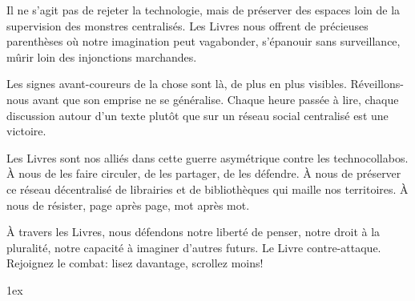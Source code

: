 \documentclass[a5paper, 10pt, twoside]{book}
\begin{document}
Il ne s’agit pas de rejeter la technologie, mais de préserver des
espaces loin de la supervision des monstres centralisés. Les Livres nous
offrent de précieuses parenthèses où notre imagination peut vagabonder,
s’épanouir sans surveillance, mûrir loin des injonctions marchandes.

Les signes avant-coureurs de la chose sont là, de plus en plus visibles.
Réveillons-nous avant que son emprise ne se généralise. Chaque heure
passée à lire, chaque discussion autour d’un texte plutôt que sur un
réseau social centralisé est une victoire.

Les Livres sont nos alliés dans cette guerre asymétrique contre les
technocollabos. À nous de les faire circuler, de les partager, de les
défendre. À nous de préserver ce réseau décentralisé de librairies et de
bibliothèques qui maille nos territoires. À nous de résister, page après
page, mot après mot.

À travers les Livres, nous défendons notre liberté de penser, notre
droit à la pluralité, notre capacité à imaginer d’autres futurs. Le
Livre contre-attaque. Rejoignez le combat: lisez davantage, scrollez
moins!

\clearpage
\begingroup
\parindent 0pt
\parskip 1ex
\def\enotesize{\small}
\theendnotes
\endgroup
\end{document}
